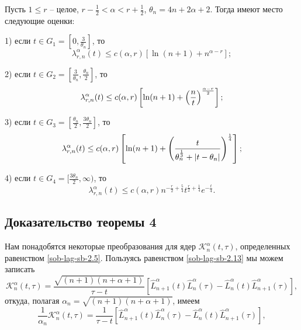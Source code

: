 \begin{theorem}
Пусть $1\le r$ -- целое, $r-\frac12<\alpha< r+\frac12$, $\theta_n=4n+2\alpha+2$. Тогда имеют место следующие оценки:

1) если $t \in G_1=[0,\frac3{\theta_n}]$,  то
\begin{equation}\label{sob-lag-sb-6.10}
\lambda^\alpha_{r,n}(t) \leq c(\alpha,r)[\ln(n+1)+n^{\alpha-r}];
\end{equation}

2) если $t \in G_2=[\frac3{\theta_n},\frac{\theta_n}2]$, то
\begin{equation}
\lambda_{r,n}^\alpha(t) \leq c(\alpha,r)\left[\ln(n+1)+\left({n\over t}\right)^{\alpha-r\over2}\right];
\label{sob-lag-sb-6.11}
\end{equation}

3) если $t \in G_3=[\frac{\theta_n}2,\frac{3\theta_n}2]$, то
\begin{equation}
\lambda_{r,n}^\alpha(t) \leq c(\alpha,r)\left[\ln(n+1)+\left({t\over \theta_n^{\frac13}+|t-\theta_n| }\right)^\frac14\right];
\label{sob-lag-sb-6.12}
\end{equation}

4) если $t \in G_4=[\frac{3\theta_n}2,\infty)$, то
\begin{equation}
\lambda_{r,n}^\alpha(t) \leq c(\alpha,r)n^{-\frac{r}{2}+\frac54}t^{\frac r2+\frac14}e^{-\frac{t}{4}}.
\label{sob-lag-sb-6.13}
\end{equation}
\end{theorem}








\subsection{Доказательство теоремы 4 }
  Нам понадобятся некоторые преобразования для ядер $\mathcal{K}_n^\alpha(t,\tau)$, определенных равенством \eqref{sob-lag-sb-2.5}. Пользуясь равенством \eqref{sob-lag-sb-2.13} мы можем записать
\begin{equation}\label{sob-lag-sb-7.1}
  \mathcal{K}_n^\alpha(t,\tau)=\frac{\sqrt{(n+1)(n+\alpha+1)}}{\tau-t}\left[\hat{L}_{n+1}^\alpha(t)\hat{L}_n^\alpha(\tau)-\hat{L}_n^\alpha(t)\hat{L}_{n+1}^\alpha(\tau)\right],
\end{equation}
откуда, полагая $\alpha_n=\sqrt{(n+1)(n+\alpha+1)}$, имеем
\begin{equation}\label{sob-lag-sb-7.2}
\frac{1}{\alpha_n}\mathcal{K}_n^\alpha (t,\tau) =
\frac{1}{\tau - t}
\left[\hat{L}_{n+1}^{\alpha}(t) \hat{L}_{n}^{\alpha}(\tau) - \hat{L}_n^{\alpha}(t)\hat{L}_{n+1}^\alpha (\tau)
\right],
\end{equation}

